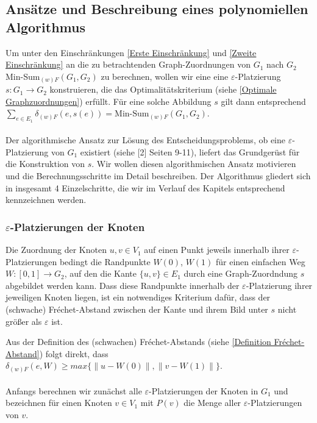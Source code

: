 \documentclass[a4paper, 12pt, twoside]{article}
\theoremstyle{Format1} %
\begin{document}
\subsection{Ansätze und Beschreibung eines polynomiellen Algorithmus} \label{Grundidee des Algorithmus}
Um unter den Einschränkungen \ref{Erste Einschränkung} und \ref{Zweite Einschränkung} an die zu betrachtenden Graph-Zuordnungen von $G_1$ nach $G_2$
Min-Sum$_{(w)F}(G_1,G_2)$ zu berechnen, wollen wir eine
eine $\varepsilon$-Platzierung $s: G_1 \to G_2$ konstruieren, die das Optimalitätskriterium (siehe \ref{Optimale Graphzuordnungen}) erfüllt.
Für eine solche Abbildung $s$ gilt dann entsprechend $\sum_{e \in E_1}\delta_{(w)F}(e, s(e)) = \text{Min-Sum}_{(w)F}(G_1,G_2)$.
\\
\\
Der algorithmische Ansatz zur Lösung des Entscheidungsproblems, ob eine $\varepsilon$-Platzierung von $G_1$ existiert (siehe [2] Seiten 9-11), liefert das
Grundgerüst für die Konstruktion von $s$. Wir wollen diesen algorithmischen Ansatz motivieren und die Berechnungsschritte im Detail beschreiben.
Der Algorithmus gliedert sich in insgesamt 4 Einzelschritte, die wir im Verlauf des Kapitels entsprechend kennzeichnen werden.

\subsubsection{$\varepsilon$-Platzierungen der Knoten} \label{Platzierungen der Knoten}
Die Zuordnung der Knoten $u,v \in V_1$ auf einen Punkt jeweils innerhalb ihrer $\varepsilon$-Platzierungen bedingt die Randpunkte $W(0)$, $W(1)$
für einen einfachen Weg $W: [0,1] \to G_2$, auf den die Kante $\{u,v\} \in E_1$ durch eine Graph-Zuordndung $s$ abgebildet werden kann.
Dass diese Randpunkte innerhalb der $\varepsilon$-Platzierung ihrer jeweiligen Knoten liegen, ist ein notwendiges Kriterium dafür, dass der (schwache) Fréchet-Abstand
zwischen der Kante und ihrem Bild unter $s$ nicht größer als $\varepsilon$ ist.

Aus der Definition des (schwachen) Fréchet-Abstands (siehe \ref{Definition Fréchet-Abstand}) folgt direkt, dass
$\delta_{(w)F}(e, W) \geq max{\{\|u-W(0)\|, \|v-W(1)\|\}}$.
\\
\\
Anfangs berechnen wir zunächst alle $\varepsilon$-Platzierungen der Knoten in $G_1$ und bezeichnen für einen Knoten $v \in V_1$ mit $P(v)$ die Menge
aller $\varepsilon$-Platzierungen von $v$.
\end{document}
